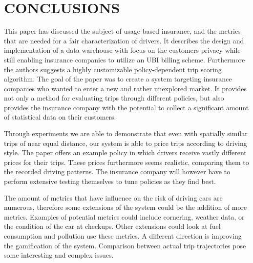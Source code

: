 \section{CONCLUSIONS}
This paper has discussed the subject of usage-based insurance, and the metrics that are needed for a fair characterization of drivers. It describes the design and implementation of a data warehouse with focus on the customers privacy while still enabling insurance companies to utilize an UBI billing scheme. Furthermore the authors suggests a highly customizable policy-dependent trip scoring algorithm.
The goal of the paper was to create a system targeting insurance companies who wanted to enter a new and rather unexplored market. It provides not only a method for evaluating trips through different policies, but also provides the insurance company with the potential to collect a significant amount of statistical data on their customers.

Through experiments we are able to demonstrate that even with spatially similar trips of near equal distance, our system is able to price trips according to driving style. The paper offers an example policy in which drivers receive vastly different prices for their trips. These prices furthermore seems realistic, comparing them to the recorded driving patterns. The insurance company will however have to perform extensive testing themselves to tune policies as they find best. 

The amount of metrics that have influence on the risk of driving cars are numerous, therefore some extensions of the system could be the addition of more metrics. Examples of potential metrics could include cornering, weather data, or the condition of the car at checkups. Other extensions could look at fuel consumption and pollution use these metrics.
A different direction is improving the gamification of the system. Comparison between actual trip trajectories pose some interesting and complex issues.


\addtolength{\textheight}{-12cm}   %
